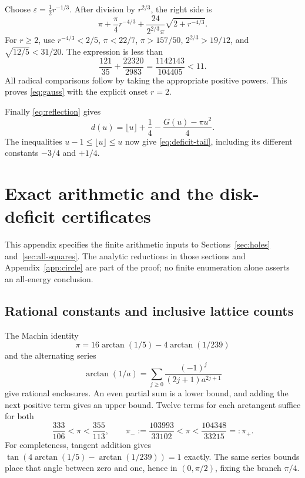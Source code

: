 \documentclass[11pt,reqno]{amsart}
\numberwithin{equation}{section}
\begin{document}
Choose $\varepsilon=\tfrac12r^{-1/3}$. After division by
$r^{2/3}$, the right side is
\[
 \pi+\frac\pi4r^{-4/3}
 +\frac{24}{2^{2/3}\pi}\sqrt{2+r^{-4/3}}.
\]
For $r\ge2$, use $r^{-4/3}<2/5$, $\pi<22/7$,
$\pi>157/50$, $2^{2/3}>19/12$, and
$\sqrt{12/5}<31/20$. The expression is less than
\begin{equation}\label{eq:gauss-constant}
 \frac{121}{35}+\frac{22320}{2983}
 =\frac{1142143}{104405}<11.
\end{equation}
All radical comparisons follow by taking the appropriate
positive powers. This proves \eqref{eq:gauss} with the
explicit onset $r=2$.

Finally \eqref{eq:reflection} gives
\[
 d(u)=\lfloor u\rfloor+\frac14
             -\frac{G(u)-\pi u^2}{4}.
\]
The inequalities $u-1\le\lfloor u\rfloor\le u$ now give
\eqref{eq:deficit-tail}, including its different constants
$-3/4$ and $+1/4$.

\section{Exact arithmetic and the disk-deficit certificates}\label{app:certificate}

This appendix specifies the finite arithmetic inputs to
Sections~\ref{sec:holes} and~\ref{sec:all-squares}.
The analytic reductions in those sections and
Appendix~\ref{app:circle} are part of the proof; no finite
enumeration alone asserts an all-energy conclusion.

\subsection*{Rational constants and inclusive lattice counts}

The Machin identity
\[
 \pi=16\arctan(1/5)-4\arctan(1/239)
\]
and the alternating series
\[
 \arctan(1/a)=\sum_{j\ge0}\frac{(-1)^j}{(2j+1)a^{2j+1}}
\]
give rational enclosures. An even partial sum is a lower
bound, and adding the next positive term gives an upper
bound. Twelve terms for each arctangent suffice for both
\begin{equation}\label{eq:pi-bracket}
 \frac{333}{106}<\pi<\frac{355}{113},
 \qquad
 \pi_-:=\frac{103993}{33102}<\pi<\frac{104348}{33215}=: \pi_+.
\end{equation}
For completeness, tangent addition gives
$\tan(4\arctan(1/5)-\arctan(1/239))=1$ exactly.
The same series bounds place that angle between zero and
one, hence in $(0,\pi/2)$, fixing the branch $\pi/4$.
\end{document}
